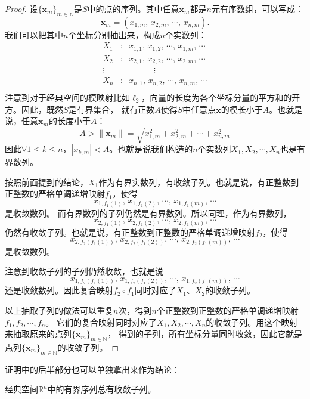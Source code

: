 \documentclass[12pt,UTF8]{ctexbook}
\begin{document}
\begin{appendix}
\begin{proof}
    设$\{\mathbf{x}_m\}_{m\in\mathbb{N}}$是$S$中的点的序列。其中任意$\mathbf{x}_m$都是$n$元有序数组，可以写成：
    $$ \mathbf{x}_m = (x_{1,m},\, x_{2,m},\,\cdots, \, x_{n,m}). $$
    我们可以把其中$n$个坐标分别抽出来，构成$n$个实数列：
    \begin{align*}
        X_1 &:\;\; x_{1,1}, \, x_{1,2},\, \cdots, \, x_{1,m}, \, \cdots \\
        X_2 &:\;\; x_{2,1}, \, x_{2,2},\, \cdots, \, x_{2,m}, \, \cdots \\
        \vdots& \qquad \qquad \vdots \\
        X_n &:\;\; x_{n,1}, \, x_{n,2},\, \cdots, \, x_{n,m}, \, \cdots \\
    \end{align*}
    注意到对于经典空间的模映射比如$\ell_2$，向量的长度为各个坐标分量的平方和的开方。因此，既然$S$是有界集合，
    就有正数$A$使得$S$中任意点$\mathbf{x}$的模长小于$A$。也就是说，任意$\mathbf{x}_m$的长度小于$A$：
    $$ A > \| \mathbf{x}_m \| = \sqrt{x_{1,m}^2 +  x_{2,m}^2 + \cdots + x_{n,m}^2}$$
    因此$\forall 1\leqslant k \leqslant n$，$|x_{k,m}| < A$。也就是说我们构造的$n$个实数列$X_1,X_2,\cdots,X_n$也是有界数列。

    按照前面提到的结论，$X_1$作为有界实数列，有收敛子列。也就是说，有正整数到正整数的严格单调递增映射$f_1$，使得
    $$ x_{1,f_1(1)}, \, x_{1,f_1(2)},\, \cdots, \, x_{1,f_1(m)}, \, \cdots $$
    是收敛数列。
    而有界数列的子列仍然是有界数列。所以同理，作为有界数列，
    $$ x_{2,f_1(1)}, \, x_{2,f_1(2)},\, \cdots, \, x_{2,f_1(m)}, \, \cdots $$
    仍然有收敛子列。也就是说，有正整数到正整数的严格单调递增映射$f_2$，使得
    $$ x_{2,f_2(f_1(1))}, \, x_{2,f_2(f_1(2))},\, \cdots, \, x_{2,f_2(f_1(m))}, \, \cdots $$
    是收敛数列。

    注意到收敛子列的子列仍然收敛，也就是说
    $$ x_{1,f_2(f_1(1))}, \, x_{1,f_2(f_1(2))},\, \cdots, \, x_{1,f_2(f_1(m))}, \, \cdots $$
    还是收敛数列。因此复合映射$f_2\circ f_1$同时对应了$X_1$、$X_2$的收敛子列。

    以上抽取子列的做法可以重复$n$次，得到$n$个正整数到正整数的严格单调递增映射$f_1, f_2, \cdots ,f_n$。
    它们的复合映射同时对应了$X_1,X_2,\cdots,X_n$的收敛子列。用这个映射来抽取原来的点列$\{\mathbf{x}_m\}_{m\in\mathbb{N}}$，
    得到的子列，所有坐标分量同时收敛，因此它就是点列$\{\mathbf{x}_m\}_{m\in\mathbb{N}}$的收敛子列。

\end{proof}

证明中的后半部分也可以单独拿出来作为结论：
\begin{tm}
    经典空间$\mathbb{R}^n$中的有界序列总有收敛子列。
\end{tm}


\end{appendix}
\end{document}
